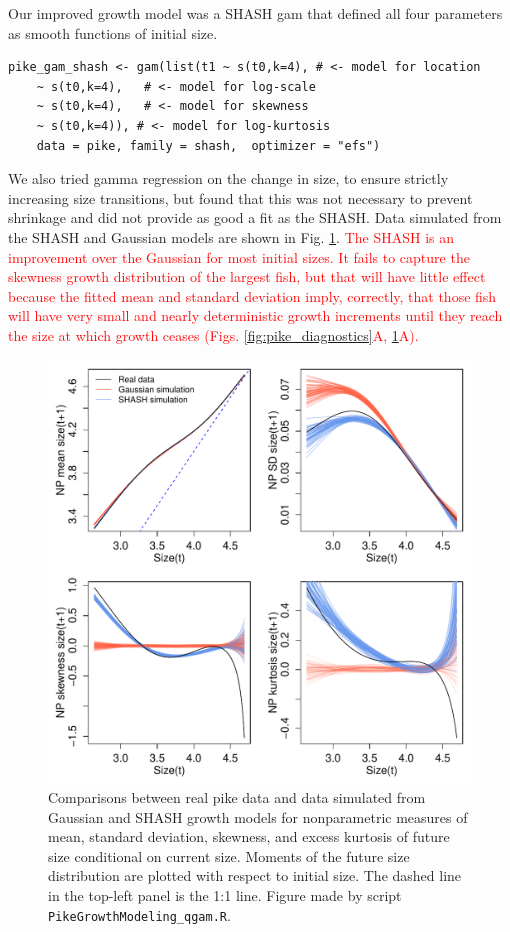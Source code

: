 \documentclass[12pt]{article}
\newcommand{\new}{\textcolor{red}}
\begin{document}
Our improved growth model was a SHASH gam that defined all four parameters as smooth functions of initial size.
\begin{lstlisting}
pike_gam_shash <- gam(list(t1 ~ s(t0,k=4), # <- model for location 
	~ s(t0,k=4),   # <- model for log-scale
	~ s(t0,k=4),   # <- model for skewness
	~ s(t0,k=4)), # <- model for log-kurtosis
	data = pike, family = shash,  optimizer = "efs")
\end{lstlisting}
We also tried gamma regression on the change in size, to ensure strictly increasing size transitions, but found that this was not necessary to prevent shrinkage and did not provide as good a fit as the SHASH. 
Data simulated from the SHASH and Gaussian models are shown in Fig. \ref{fig:pikeSims}. \new{The SHASH is an improvement over the Gaussian for most initial sizes. It fails 
to capture the skewness growth distribution of the largest fish, but that will have little effect because the fitted mean and standard deviation imply, correctly, that those
fish will have very small and nearly deterministic growth increments until they reach the size at which growth ceases (Figs. \ref{fig:pike_diagnostics}A, \ref{fig:pikeSims}A).  }

\begin{figure}[tbp]
	\centering
	\includegraphics[width=1.0\textwidth]{figures/pike_growth_sims.pdf}
	\caption{Comparisons between real pike data and data simulated from Gaussian and SHASH growth models for nonparametric measures of mean, standard deviation, 
	skewness, and excess kurtosis of future size conditional on current size. 
		Moments of the future size distribution are plotted with respect to initial size. The dashed line in the top-left panel is the 1:1 line. 
		Figure made by script \texttt{PikeGrowthModeling\_qgam.R}.}
	\label{fig:pikeSims}
\end{figure} 
\end{document}
